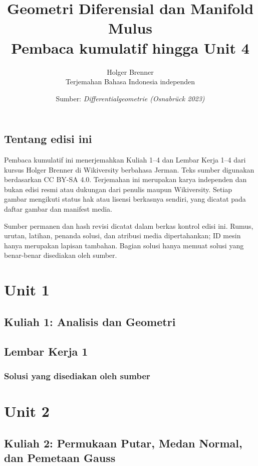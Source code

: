 \documentclass[11pt,a4paper,oneside]{book}
\title{Geometri Diferensial dan Manifold Mulus\\\large Pembaca kumulatif hingga Unit 4}
\author{Holger Brenner\\Terjemahan Bahasa Indonesia independen}
\date{Sumber: \textit{Differentialgeometrie (Osnabrück 2023)}}
\begin{document}
\hypersetup{pageanchor=false}
\maketitle
\hypersetup{pageanchor=true}
\frontmatter
\chapter*{Tentang edisi ini}
Pembaca kumulatif ini menerjemahkan Kuliah 1--4 dan Lembar Kerja 1--4 dari kursus Holger Brenner di Wikiversity berbahasa Jerman. Teks sumber digunakan berdasarkan CC BY-SA 4.0. Terjemahan ini merupakan karya independen dan bukan edisi resmi atau dukungan dari penulis maupun Wikiversity. Setiap gambar mengikuti status hak atau lisensi berkasnya sendiri, yang dicatat pada daftar gambar dan manifest media.

Sumber permanen dan hash revisi dicatat dalam berkas kontrol edisi ini. Rumus, urutan, latihan, penanda solusi, dan atribusi media dipertahankan; ID mesin hanya merupakan lapisan tambahan. Bagian solusi hanya memuat solusi yang benar-benar disediakan oleh sumber.
\tableofcontents

\mainmatter
\part{Unit 1}
\chapter[Kuliah 1]{Kuliah 1: Analisis dan Geometri}


\chapter{Lembar Kerja 1}


\section*{Solusi yang disediakan oleh sumber}


\part{Unit 2}
\chapter[Kuliah 2]{Kuliah 2: Permukaan Putar, Medan Normal, dan Pemetaan Gauss}

\end{document}
